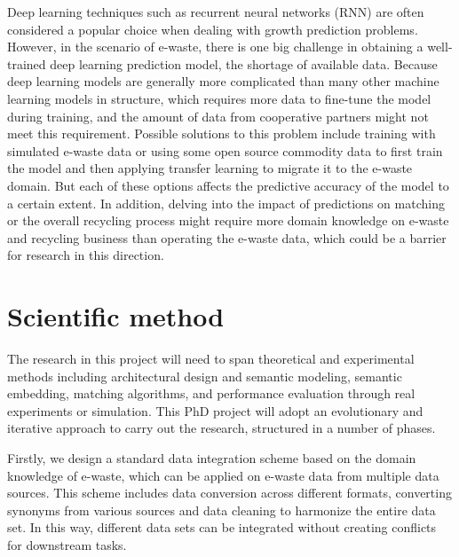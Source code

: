 \documentclass{article}
\numberwithin{equation}{section}
\begin{document}
Deep learning techniques such as recurrent neural networks (RNN) are often considered a popular choice when dealing with growth prediction problems. However, in the scenario of e-waste, there is one big challenge in obtaining a well-trained deep learning prediction model, the shortage of available data. Because deep learning models are generally more complicated than many other machine learning models in structure, which requires more data to fine-tune the model during training, and the amount of data from cooperative partners might not meet this requirement. Possible solutions to this problem include training with simulated e-waste data or using some open source commodity data to first train the model and then applying transfer learning to migrate it to the e-waste domain. But each of these options affects the predictive accuracy of the model to a certain extent. In addition, delving into the impact of predictions on matching or the overall recycling process might require more domain knowledge on e-waste and recycling business than operating the e-waste data, which could be a barrier for research in this direction.

\section{Scientific method}
The research in this project will need to span theoretical and experimental methods including architectural design and semantic modeling, semantic embedding, matching algorithms, and performance evaluation through real experiments or simulation. This PhD project will adopt an evolutionary and iterative approach to carry out the research, structured in a number of phases.

Firstly, we design a standard data integration scheme based on the domain knowledge of e-waste, which can be applied on e-waste data from multiple data sources. This scheme includes data conversion across different formats, converting synonyms from various sources and data cleaning to harmonize the entire data set. In this way, different data sets can be integrated without creating conflicts for downstream tasks.
\end{document}
